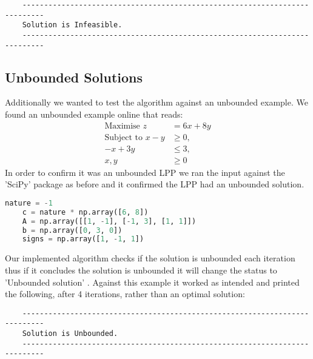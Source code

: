 \documentclass{article}
\numberwithin{equation}{section}
\begin{document}
\begin{lstlisting}
    ---------------------------------------------------------------------------
    Solution is Infeasible.
    ---------------------------------------------------------------------------
\end{lstlisting}
\newpage
\subsection{Unbounded Solutions}
Additionally we wanted to test the algorithm against an unbounded example. We found an unbounded example online that reads:
\begin{align}
    \text{Maximise }z &= 6x + 8y \\
    \text{Subject to }x - y &\geq 0, \\
    -x + 3y &\leq 3, \\
    x, y &\geq 0
\end{align}
In order to confirm it was an unbounded LPP we ran the input against the 'SciPy' package as before and it confirmed the LPP had an unbounded solution.
\begin{lstlisting}[language=Python, basicstyle=\scriptsize, frame=single]
    nature = -1                                            
    c = nature * np.array([6, 8])
    A = np.array([[1, -1], [-1, 3], [1, 1]])
    b = np.array([0, 3, 0])
    signs = np.array([1, -1, 1]) 
\end{lstlisting}
Our implemented algorithm checks if the solution is unbounded each iteration thus if it concludes the solution is unbounded it will change the status to 'Unbounded solution' .
Against this example it worked as intended and printed the following, after 4 iterations, rather than an optimal solution:
\begin{lstlisting}
    ---------------------------------------------------------------------------
    Solution is Unbounded.
    ---------------------------------------------------------------------------
\end{lstlisting}
\newpage
\end{document}
